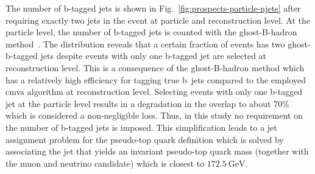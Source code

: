 The number of b-tagged jets is shown in Fig.~\ref{fig:prospects-particle-njets} after requiring exactly two jets in the event at particle and reconstruction level. 
At the particle level, the number of b-tagged jets is counted with the ghost-B-hadron method~\cite{Cacciari:2008gn}. The distribution reveals that a certain fraction of events has two ghost-b-tagged jets despite events with only one b-tagged jet are selected at reconstruction level. This is a consequence of the ghost-B-hadron method which has a relatively high efficiency for tagging true b~jets compared to the employed \gls{cmva} algorithm at reconstruction level. Selecting events with only one b-tagged jet at the particle level results in a degradation in the overlap to about 70\% which is considered a non-negligible loss. Thus, in this study no requirement on the number of b-tagged jets is imposed. This simplification leads to a jet assignment problem for the pseudo-top quark definition which is solved by associating the jet that yields an invariant pseudo-top quark mass (together with the muon and neutrino candidate) which is closest to $172.5~\mathrm{GeV}$.


